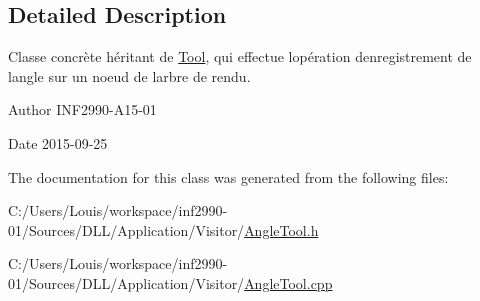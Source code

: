 \subsection{Detailed Description}
Classe concrète héritant de \hyperlink{class_tool}{Tool}, qui effectue l\textquotesingle{}opération d\textquotesingle{}enregistrement de l\textquotesingle{}angle sur un noeud de l\textquotesingle{}arbre de rendu. 

\begin{DoxyAuthor}{Author}
I\+N\+F2990-\/\+A15-\/01 
\end{DoxyAuthor}
\begin{DoxyDate}{Date}
2015-\/09-\/25 
\end{DoxyDate}


The documentation for this class was generated from the following files\+:\begin{DoxyCompactItemize}
\item 
C\+:/\+Users/\+Louis/workspace/inf2990-\/01/\+Sources/\+D\+L\+L/\+Application/\+Visitor/\hyperlink{_angle_tool_8h}{Angle\+Tool.\+h}\item 
C\+:/\+Users/\+Louis/workspace/inf2990-\/01/\+Sources/\+D\+L\+L/\+Application/\+Visitor/\hyperlink{_angle_tool_8cpp}{Angle\+Tool.\+cpp}\end{DoxyCompactItemize}

